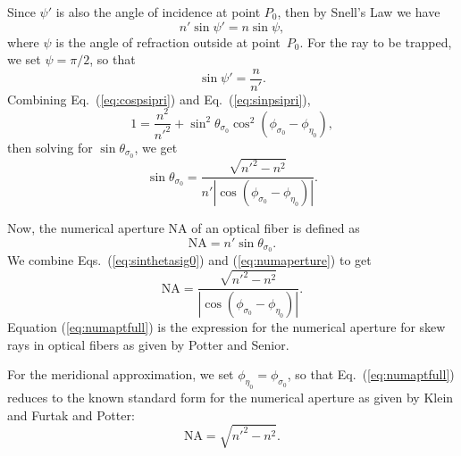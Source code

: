 \documentclass[a4paper,twocolumn,superscriptaddress]{revtex4-1}
\begin{document}
{Since $\psi'$ is also the angle of incidence at point $P_0$, then by Snell's Law we have
\begin{equation}
n' \sin \psi' = n \sin \psi ,
\end{equation}
where $\psi$ is the angle of refraction outside at point~$P_0$.
For the ray to be trapped, we set $\psi = \pi / 2$, so that
\begin{equation}
\label{eq:sinpsipri}
\sin \psi' = \dfrac{n}{n'} .
\end{equation}
Combining Eq.~(\ref{eq:cospsipri}) and Eq.~(\ref{eq:sinpsipri}),
\begin{equation}
1 = \dfrac{n^2}{n'^2} + \sin^2 \theta_{ \sigma_0 } \cos^2 (\phi_{ \sigma_0 } - \phi_{ \eta_0 }) ,
\end{equation}
then solving for $\sin \theta_{ \sigma_0 }$, we get
\begin{equation}
\label{eq:sinthetasig0}
\sin \theta_{ \sigma_0 } = \dfrac{\displaystyle \sqrt{n'^2 - n^2}}{n' | \cos (\phi_{ \sigma_0 } - \phi_{ \eta_0 }) | } .
\end{equation}

Now, the numerical aperture NA of an optical fiber is defined as
\begin{equation}
\label{eq:numaperture}
\mathrm{NA} = n' \sin \theta_{ \sigma_0 } .
\end{equation}
We combine Eqs.~(\ref{eq:sinthetasig0}) and (\ref{eq:numaperture}) to get
\begin{equation}
\label{eq:numaptfull}
\mathrm{NA} = \dfrac{\displaystyle \sqrt{n'^2 - n^2}}{|\cos (\phi_{ \sigma_0 } - \phi_{ \eta_0 })|} .
\end{equation}
Equation (\ref{eq:numaptfull}) is the expression for the numerical aperture for skew rays in optical fibers as given by Potter\cite{Potter,Potter2} and Senior\cite{senior}.

For the meridional approximation, we set $\phi_{\eta_0} = \phi_{\sigma_0}$, so that Eq.~(\ref{eq:numaptfull}) reduces to the known standard form for the numerical aperture as given by Klein and Furtak\cite{kleitak} and Potter\cite{Potter}:
\begin{equation}
\label{eq:meridionalnumapt}
\mathrm{NA} = \sqrt{n'^2 - n^2} .
\end{equation} 

}
\end{document}
